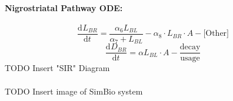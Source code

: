 \documentclass[smallextended]{svjour3}
\newcommand{\od}[3][]{\ensuremath{\frac{\mathrm{d}^{#1} {#2}}{\mathrm{d}{#3}^{#1}}}}
\newcommand{\todo}[1]{{\huge\color{red}TODO {#1}}}
\begin{document}
\paragraph{Nigrostriatal Pathway ODE:}
\begin{equation}
\label{eq:16}
\od{L_{BR}}{t} = \frac{\alpha_6 L_{BL}}{\alpha_7 + L_{BL}} - \alpha_8 \cdot L_{BR} \cdot A - \text{[Other]}
\end{equation}
\begin{equation}
\label{eq:17}
\od{D_{BR}}{t} = \alpha L_{BL} \cdot A - \frac{\text{decay}}{\text{usage}}
\end{equation}
\todo{Insert "SIR" Diagram}
\\ \\
\todo{Insert image of SimBio system}
\\ \\
%
%
\end{document}
